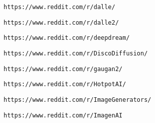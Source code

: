          
         
          \protect\hypertarget{ID_1414792488}{}{}

\begin{verbatim}
https://www.reddit.com/r/dalle/
\end{verbatim}
         

         
         
          \protect\hypertarget{ID_1183521873}{}{}

\begin{verbatim}
https://www.reddit.com/r/dalle2/
\end{verbatim}
         

         
         
          \protect\hypertarget{ID_1753392806}{}{}

\begin{verbatim}
https://www.reddit.com/r/deepdream/
\end{verbatim}
         

         
         
          \protect\hypertarget{ID_434566190}{}{}

\begin{verbatim}
https://www.reddit.com/r/DiscoDiffusion/
\end{verbatim}
         

         
         
          \protect\hypertarget{ID_437110490}{}{}

\begin{verbatim}
https://www.reddit.com/r/gaugan2/
\end{verbatim}
         

         
         
          \protect\hypertarget{ID_278128546}{}{}

\begin{verbatim}
https://www.reddit.com/r/HotpotAI/
\end{verbatim}
         

         
         
          \protect\hypertarget{ID_197860973}{}{}

\begin{verbatim}
https://www.reddit.com/r/ImageGenerators/
\end{verbatim}
         

         
         
          \protect\hypertarget{ID_971947917}{}{}

\begin{verbatim}
https://www.reddit.com/r/ImagenAI
\end{verbatim}
         

